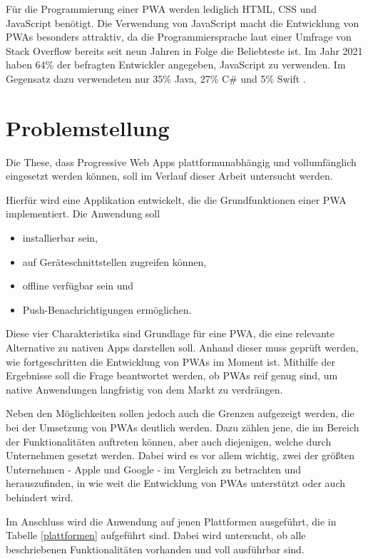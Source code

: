 Für die Programmierung einer PWA werden lediglich HTML, CSS und JavaScript benötigt. Die Verwendung von JavaScript macht die Entwicklung von PWAs besonders attraktiv, da die Programmiersprache laut einer Umfrage von Stack Overflow bereits seit neun Jahren in Folge die Beliebteste ist. Im Jahr 2021 haben 64\% der befragten Entwickler angegeben, JavaScript zu verwenden. Im Gegensatz dazu verwendeten nur 35\% Java, 27\% C\# und 5\% Swift \cite{stackoverflow2021}. 


\section{Problemstellung}\label{Problemstellung}

Die These, dass Progressive Web Apps plattformunabhängig und vollumfänglich eingesetzt werden können, soll im Verlauf dieser Arbeit untersucht werden. 

Hierfür wird eine Applikation entwickelt, die die Grundfunktionen einer PWA implementiert. Die Anwendung soll 
 \begin{itemize}
     \item installierbar sein,
     \item auf Geräteschnittstellen zugreifen können,
     \item offline verfügbar sein und
     \item Push-Benachrichtigungen ermöglichen. 
 \end{itemize}
 
Diese vier Charakteristika sind Grundlage für eine PWA, die eine relevante Alternative zu nativen Apps darstellen soll. Anhand dieser muss geprüft werden, wie fortgeschritten die Entwicklung von PWAs im Moment ist. Mithilfe der Ergebnisse soll die Frage beantwortet werden, ob PWAs reif genug sind, um native Anwendungen langfristig von dem Markt zu verdrängen. 

Neben den Möglichkeiten sollen jedoch auch die Grenzen aufgezeigt werden, die bei der Umsetzung von PWAs deutlich werden. Dazu zählen jene, die im Bereich der Funktionalitäten auftreten können, aber auch diejenigen, welche durch Unternehmen gesetzt werden. Dabei wird es vor allem wichtig, zwei der größten Unternehmen - Apple und Google - im Vergleich zu betrachten und herauszufinden, in wie weit die Entwicklung von PWAs unterstützt oder auch behindert wird.

Im Anschluss wird die Anwendung auf jenen Plattformen ausgeführt, die in Tabelle \ref{plattformen} aufgeführt sind. Dabei wird untersucht, ob alle beschriebenen Funktionalitäten vorhanden und voll ausführbar sind. 

